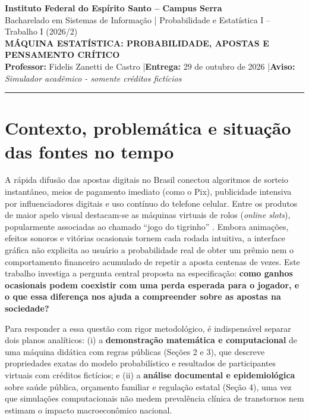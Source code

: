 \documentclass[10pt,a4paper]{article}
\begin{document}
\begin{center}
    {\bfseries Instituto Federal do Espírito Santo -- Campus Serra}\\
    {\small Bacharelado em Sistemas de Informação | Probabilidade e Estatística I -- Trabalho I (2026/2)}\\[6pt]
    {\Large \bfseries MÁQUINA ESTATÍSTICA: PROBABILIDADE, APOSTAS E PENSAMENTO CRÍTICO}\\[4pt]
    {\small \textbf{Professor:} Fidelis Zanetti de Castro \quad|\quad \textbf{Entrega:} 29 de outubro de 2026 \quad|\quad \textbf{Aviso:} \textit{Simulador acadêmico - somente créditos fictícios}}
\end{center}
\hrule
\vspace{8pt}

\section{Contexto, problemática e situação das fontes no tempo}

A rápida difusão das apostas digitais no Brasil conectou algoritmos de sorteio instantâneo, meios de pagamento imediato (como o Pix), publicidade intensiva por influenciadores digitais e uso contínuo do telefone celular. Entre os produtos de maior apelo visual destacam-se as máquinas virtuais de rolos (\textit{online slots}), popularmente associadas ao chamado ``jogo do tigrinho'' \cite{ribas2025,pacete2024}. Embora animações, efeitos sonoros e vitórias ocasionais tornem cada rodada intuitiva, a interface gráfica não explicita ao usuário a probabilidade real de obter um prêmio nem o comportamento financeiro acumulado de repetir a aposta centenas de vezes. Este trabalho investiga a pergunta central proposta na especificação: \textbf{como ganhos ocasionais podem coexistir com uma perda esperada para o jogador, e o que essa diferença nos ajuda a compreender sobre as apostas na sociedade?}

Para responder a essa questão com rigor metodológico, é indispensável separar dois planos analíticos: (i) a \textbf{demonstração matemática e computacional} de uma máquina didática com regras públicas (Seções 2 e 3), que descreve propriedades exatas do modelo probabilístico e resultados de participantes virtuais com créditos fictícios; e (ii) a \textbf{análise documental e epidemiológica} sobre saúde pública, orçamento familiar e regulação estatal (Seção 4), uma vez que simulações computacionais não medem prevalência clínica de transtornos nem estimam o impacto macroeconômico nacional.
\end{document}
